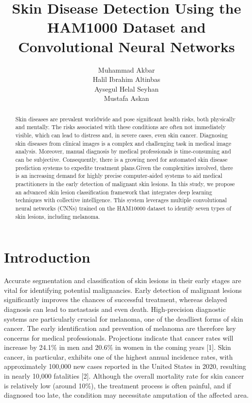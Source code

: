 \documentclass{article}
\title{Skin Disease Detection Using the HAM1000 Dataset and Convolutional Neural Networks}
\author{Muhammad Akbar\\ Halil Ibrahim Altinbas\\
Aysegul Helal Seyhan\\
Mustafa Askan\\ }
\begin{document}
\maketitle

\begin{abstract}
Skin diseases are prevalent worldwide and pose significant health risks, both physically and mentally. The risks associated with these conditions are often not immediately visible, which can lead to distress and, in severe cases, even skin cancer. Diagnosing skin diseases from clinical images is a complex and challenging task in medical image analysis. Moreover, manual diagnosis by medical professionals is time-consuming and can be subjective. Consequently, there is a growing need for automated skin disease prediction systems to expedite treatment plans.Given the complexities involved, there is an increasing demand for highly precise computer-aided systems to aid medical practitioners in the early detection of malignant skin lesions. In this study, we propose an advanced skin lesion classification framework that integrates deep learning techniques with collective intelligence. This system leverages multiple convolutional neural networks (CNNs) trained on the HAM10000 dataset to identify seven types of skin lesions, including melanoma.
\end{abstract}

\section{Introduction}Accurate segmentation and classification of skin lesions in their early stages are vital for identifying potential malignancies. Early detection of malignant lesions significantly improves the chances of successful treatment, whereas delayed diagnosis can lead to metastasis and even death. High-precision diagnostic systems are particularly crucial for melanoma, one of the deadliest forms of skin cancer. The early identification and prevention of melanoma are therefore key concerns for medical professionals. Projections indicate that cancer rates will increase by 24.1\% in men and 20.6\% in women in the coming years [1]. Skin cancer, in particular, exhibits one of the highest annual incidence rates, with approximately 100,000 new cases reported in the United States in 2020, resulting in nearly 10,000 fatalities [2]. Although the overall mortality rate for skin cancer is relatively low (around 10\%), the treatment process is often painful, and if diagnosed too late, the condition may necessitate amputation of the affected area.
\end{document}
